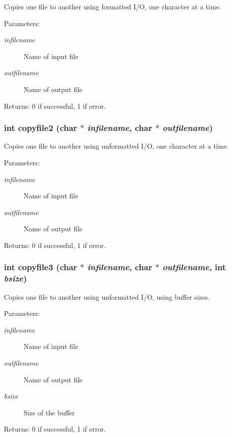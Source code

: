 Copies one file to another using formatted I/O, one character at a time. \begin{Desc}
\item[Parameters:]
\begin{description}
\item[{\em infilename}]Name of input file \item[{\em outfilename}]Name of output file \end{description}
\end{Desc}
\begin{Desc}
\item[Returns:]0 if successful, 1 if error. \end{Desc}
\subsubsection{\setlength{\rightskip}{0pt plus 5cm}int copyfile2 (char $\ast$ {\em infilename}, char $\ast$ {\em outfilename})}\label{cptest_8c_88b74a1f2a04a2c3e85579164ce6f232}


Copies one file to another using unformatted I/O, one character at a time. \begin{Desc}
\item[Parameters:]
\begin{description}
\item[{\em infilename}]Name of input file \item[{\em outfilename}]Name of output file \end{description}
\end{Desc}
\begin{Desc}
\item[Returns:]0 if successful, 1 if error. \end{Desc}
\subsubsection{\setlength{\rightskip}{0pt plus 5cm}int copyfile3 (char $\ast$ {\em infilename}, char $\ast$ {\em outfilename}, int {\em bsize})}\label{cptest_8c_f2643a5d96c55625c22762e806920280}


Copies one file to another using unformatted I/O, using buffer sizes. \begin{Desc}
\item[Parameters:]
\begin{description}
\item[{\em infilename}]Name of input file \item[{\em outfilename}]Name of output file \item[{\em bsize}]Size of the buffer \end{description}
\end{Desc}
\begin{Desc}
\item[Returns:]0 if successful, 1 if error. \end{Desc}
